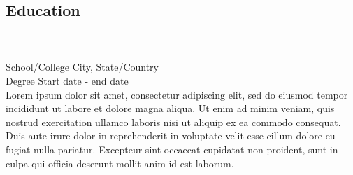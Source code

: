 \documentclass[11pt, oneside, letterpaper, titlepage]{article}
\begin{document}
\begin{tcolorbox}
\begin{minipage}[t]{5.25in}
\begin{tcolorbox}[colframe=white,colback=white,arc=0mm]
			\section*{Education}
			\vspace*{-0.2in}
			\hrulefill\\\\
			School/College \hfill City, State/Country \\
			Degree \hfill Start date - end date \\
			Lorem ipsum dolor sit amet, consectetur adipiscing elit, sed do eiusmod tempor incididunt ut labore et dolore magna aliqua. Ut enim ad minim veniam, quis nostrud exercitation ullamco laboris nisi ut aliquip ex ea commodo consequat. Duis aute irure dolor in reprehenderit in voluptate velit esse cillum dolore eu fugiat nulla pariatur. Excepteur sint occaecat cupidatat non proident, sunt in culpa qui officia deserunt mollit anim id est laborum.\\\\
		\end{tcolorbox}
	\end{minipage}
\end{tcolorbox}
\end{document}
